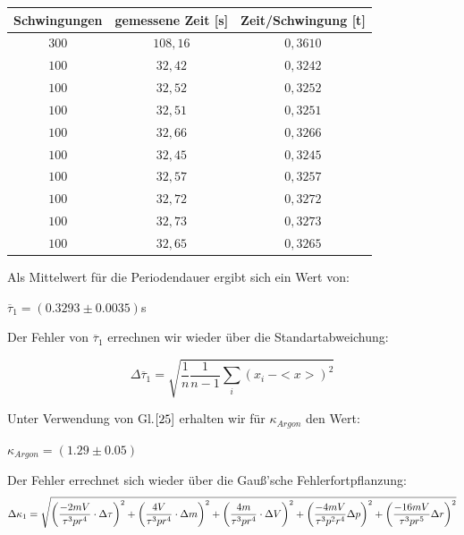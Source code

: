 \documentclass{article}
\begin{document}
{{{\begin{center}
\begin{tabular}{c|c|c}
Schwingungen & gemessene Zeit [s]& Zeit/Schwingung [t]\\
\hline 
\(300\)	& \(108,16\)& \(0,3610\)\\
\(100\)	& \(32,42\)	& \(0,3242\)\\
\(100\)	& \(32,52\)	& \(0,3252\)\\
\(100\)	& \(32,51\)	& \(0,3251\)\\
\(100\)	& \(32,66\)	& \(0,3266\)\\
\(100\)	& \(32,45\)	& \(0,3245\)\\
\(100\)	& \(32,57\)	& \(0,3257\)\\
\(100\)	& \(32,72\)	& \(0,3272\)\\
\(100\)	& \(32,73\)	& \(0,3273\)\\
\(100\)	& \(32,65\)	& \(0,3265\)\\
\end{tabular}
\end{center}

\vspace{1cm}

Als Mittelwert für die Periodendauer ergibt sich ein Wert von:
\begin{center}
\(\overline{\tau}_{1} = (0.3293 \pm 0.0035)\)s
\end{center}

Der Fehler von \(\overline{\tau}_{1}\) errechnen wir wieder über die Standartabweichung:

\begin{equation}
\Delta \overline{\tau}_{1} = \sqrt{\frac{1}{n} \frac{1}{n-1}\sum\limits_{i}(x_i \ - <x>)^2}
\end{equation}

Unter Verwendung von Gl.\(\eqref{25}\) erhalten wir für \(\kappa_{Argon}\) den Wert:
\begin{center}
\(\kappa_{Argon} = (1.29 \pm 0.05)\)
\end{center}
Der Fehler errechnet sich wieder über die Gauß'sche Fehlerfortpflanzung:
\begin{equation}
\notag
\Delta \kappa_1 =\sqrt{\left( \frac{ -2mV}{ \tau^3 p r^4}\cdot \Delta \tau\right)^2 + \left( \frac{ 4V}{\tau^3 p r^4}\cdot \Delta m \right)^2+\left( \frac{4m }{\tau^3 p r^4}\cdot\Delta V \right)^2+\left( \frac{-4mV}{\tau^3 p^2 r^4}\Delta p \right)^2+\left( \frac{-16mV}{\tau^3 p r^5}\Delta r \right)^2}
\end{equation}

}}}
\end{document}
